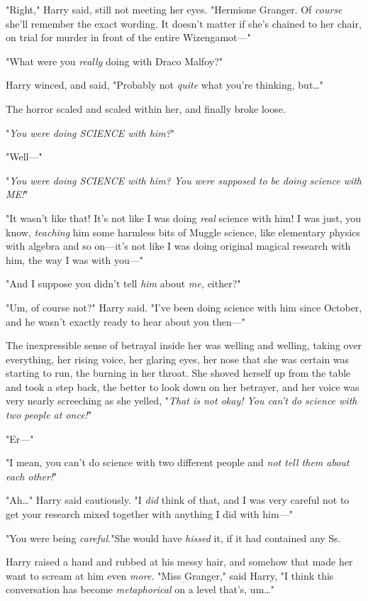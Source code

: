 "Right," Harry said, still not meeting her eyes. "Hermione Granger. Of
\emph{course} she'll remember the exact wording. It doesn't matter if she's
chained to her chair, on trial for murder in front of the entire Wizengamot---"

"What were you \emph{really} doing with Draco Malfoy?"

Harry winced, and said, "Probably not \emph{quite} what you're thinking,
but{\ldots}"

The horror scaled and scaled within her, and finally broke loose.

"\emph{You were doing SCIENCE with him?}"

"Well---"

"\emph{You were doing SCIENCE with him? You were supposed to be doing science
with ME!}"

"It wasn't like that! It's not like I was doing \emph{real} science with him! I
was just, you know, \emph{teaching} him some harmless bits of Muggle science,
like elementary physics with algebra and so on---it's not like I was doing
original magical research with him, the way I was with you---"

"And I suppose you didn't tell \emph{him} about \emph{me,} either?"

"Um, of course not?" Harry said. "I've been doing science with him since
October, and he wasn't exactly ready to hear about you then---"

The inexpressible sense of betrayal inside her was welling and welling, taking
over everything, her rising voice, her glaring eyes, her nose that she was
certain was starting to run, the burning in her throat. She shoved herself up
from the table and took a step back, the better to look down on her betrayer,
and her voice was very nearly screeching as she yelled, "\emph{That is not
okay! You can't do science with two people at once!}"

"Er---"

"I mean, you can't do science with two different people and \emph{not tell them
about each other!}"

"Ah{\ldots}" Harry said cautiously. "I \emph{did} think of that, and I was very
careful not to get your research mixed together with anything I did with him---"

"You were being \emph{careful.}"She would have \emph{hissed} it, if it had
contained any Ss.

Harry raised a hand and rubbed at his messy hair, and somehow that made her
want to scream at him even \emph{more.} "Miss Granger," said Harry, "I think
this conversation has become \emph{metaphorical} on a level that's, um{\ldots}"

